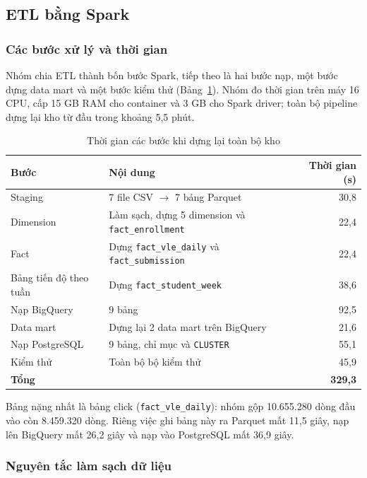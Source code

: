 \subsection{ETL bằng Spark}
\label{sec:etl}

\subsubsection{Các bước xử lý và thời gian}

Nhóm chia ETL thành bốn bước Spark, tiếp theo là hai bước nạp, một bước dựng data mart và một bước kiểm thử (Bảng~\ref{tab:etl-thoi-gian}). Nhóm đo thời gian trên máy 16 CPU, cấp 15 GB RAM cho container và 3 GB cho Spark driver; toàn bộ pipeline dựng lại kho từ đầu trong khoảng 5,5 phút.

\begin{table}[htbp]
\centering
\small
\begin{tabular}{|l|l|r|}
\hline
\textbf{Bước} & \textbf{Nội dung} & \textbf{Thời gian (s)} \\ \hline
Staging & 7 file CSV $\rightarrow$ 7 bảng Parquet & 30,8 \\ \hline
Dimension & Làm sạch, dựng 5 dimension và \texttt{fact\_enrollment} & 22,4 \\ \hline
Fact & Dựng \texttt{fact\_vle\_daily} và \texttt{fact\_submission} & 22,4 \\ \hline
Bảng tiến độ theo tuần & Dựng \texttt{fact\_student\_week} & 38,6 \\ \hline
Nạp BigQuery & 9 bảng & 92,5 \\ \hline
Data mart & Dựng lại 2 data mart trên BigQuery & 21,6 \\ \hline
Nạp PostgreSQL & 9 bảng, chỉ mục và \texttt{CLUSTER} & 55,1 \\ \hline
Kiểm thử & Toàn bộ bộ kiểm thử & 45,9 \\ \hline
\textbf{Tổng} & & \textbf{329,3} \\ \hline
\end{tabular}
\caption{Thời gian các bước khi dựng lại toàn bộ kho}
\label{tab:etl-thoi-gian}
\end{table}

Bảng nặng nhất là bảng click (\texttt{fact\_vle\_daily}): nhóm gộp 10.655.280 dòng đầu vào
còn 8.459.320 dòng. Riêng việc ghi bảng này ra Parquet mất 11,5 giây, nạp lên BigQuery mất
26,2 giây và nạp vào PostgreSQL mất 36,9 giây.

\subsubsection{Nguyên tắc làm sạch dữ liệu}


